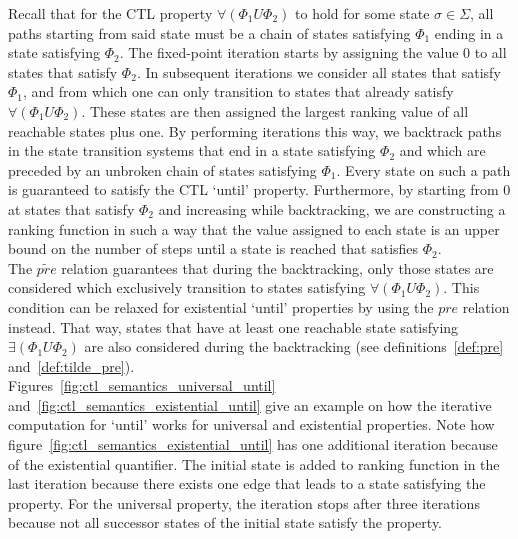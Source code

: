 \documentclass[11pt,a4paper,titlepage]{article}
\begin{document}
Recall that for the CTL property $\forall(\Phi_1 U \Phi_2)$ to hold for some state $\sigma \in \Sigma$, 
all paths starting from said state must be a chain of states satisfying $\Phi_1$ ending in a state satisfying $\Phi_2$.
The fixed-point iteration starts by assigning the value $0$ to all states that satisfy $\Phi_2$. 
In subsequent iterations we consider all states that satisfy $\Phi_1$, and from which one can only transition to states that already satisfy  
$\forall(\Phi_1 U \Phi_2)$. These states are then assigned the largest ranking value of all reachable states plus one. 
By performing iterations this way, we backtrack paths in the state transition systems that end in a state satisfying $\Phi_2$ and which are preceded by an 
unbroken chain of states satisfying $\Phi_1$. Every state on such a path is guaranteed to satisfy the CTL `until' property. 
Furthermore, by starting from $0$ at states that satisfy $\Phi_2$ and increasing while backtracking, 
we are constructing a ranking function in such a way that the value assigned to each state is an 
upper bound on the number of steps until a state is reached that satisfies $\Phi_2$.\\

The $\widetilde{pre}$ relation guarantees that during the backtracking, only those states are considered which 
exclusively transition to states satisfying $\forall(\Phi_1 U \Phi_2)$. 
This condition can be relaxed for existential `until' properties by using the $pre$ relation instead. 
That way, states that have at least one reachable state satisfying $\exists(\Phi_1 U \Phi_2)$ are also considered 
during the backtracking (see definitions~\ref{def:pre} and~\ref{def:tilde_pre}).\\

Figures~\ref{fig:ctl_semantics_universal_until} and~\ref{fig:ctl_semantics_existential_until} give an example on how the
iterative computation for `until' works for universal and existential properties. 
Note how figure~\ref{fig:ctl_semantics_existential_until} has one additional iteration because of the existential quantifier. 
The initial state is added to ranking function in the last iteration because there exists one edge that leads to a state satisfying the property.  
For the universal property, the iteration stops after three iterations because not all successor states
of the initial state satisfy the property.
\end{document}
